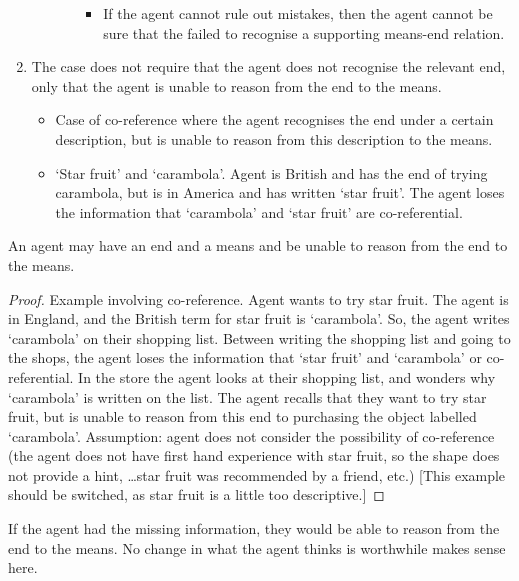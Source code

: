 \documentclass[10pt]{article}
\begin{document}
\begin{enumerate}
\begin{itemize}
\begin{enumerate}
\begin{itemize}
      \item If the agent cannot rule out mistakes, then the agent cannot be sure that the failed to recognise a supporting means-end relation.
      \end{itemize}
    \end{enumerate}
  \end{itemize}
\item The case does not require that the agent does not recognise the relevant end, only that the agent is unable to reason from the end to the means.
  \begin{itemize}
  \item Case of co-reference where the agent recognises the end under a certain description, but is unable to reason from this description to the means.
  \item `Star fruit' and `carambola'.
    Agent is British and has the end of trying carambola, but is in America and has written `star fruit'.
    The agent loses the information that `carambola' and `star fruit' are co-referential.
  \end{itemize}
\end{enumerate}




\begin{proposition}
  An agent may have an end and a means and be unable to reason from the end to the means.
  \begin{proof}
    Example involving co-reference.
    Agent wants to try star fruit.
    The agent is in England, and the British term for star fruit is `carambola'.
    So, the agent writes `carambola' on their shopping list.
    Between writing the shopping list and going to the shops, the agent loses the information that `star fruit' and `carambola' or co-referential.
    In the store the agent looks at their shopping list, and wonders why `carambola' is written on the list.
    The agent recalls that they want to try star fruit, but is unable to reason from this end to purchasing the object labelled `carambola'.
    Assumption: agent does not consider the possibility of co-reference (the agent does not have first hand experience with star fruit, so the shape does not provide a hint, \dots star fruit was recommended by a friend, etc.)
    [This example should be switched, as star fruit is a little too descriptive.]
  \end{proof}
  If the agent had the missing information, they would be able to reason from the end to the means.
  No change in what the agent thinks is worthwhile makes sense here.
\end{proposition}
\end{document}
